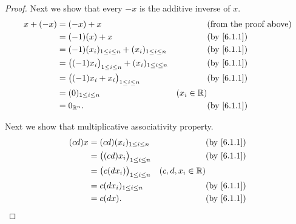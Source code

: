\begin{proof}
  Next we show that every \(-x\) is the additive inverse of \(x\).
  \begin{align*}
    x + (-x) & = (-x) + x                                                      &              & \text{(from the proof above)} \\
             & = (-1)(x) + x                                                   &              & \by{6.1.1}                    \\
             & = (-1)(x_i)_{1 \leq i \leq n} + (x_i)_{1 \leq i \leq n}         &              & \by{6.1.1}                    \\
             & = \big((-1)x_i\big)_{1 \leq i \leq n} + (x_i)_{1 \leq i \leq n} &              & \by{6.1.1}                    \\
             & = \big((-1)x_i + x_i\big)_{1 \leq i \leq n}                     &              & \by{6.1.1}                    \\
             & = (0)_{1 \leq i \leq n}                                         & (x_i \in \R)                                 \\
             & = 0_{\R^n}.                                                     &              & \by{6.1.1}
  \end{align*}

  Next we show that multiplicative associativity property.
  \begin{align*}
    (cd)x & = (cd)(x_i)_{1 \leq i \leq n}          &                    & \by{6.1.1} \\
          & = \big((cd) x_i\big)_{1 \leq i \leq n} &                    & \by{6.1.1} \\
          & = \big(c(d x_i)\big)_{1 \leq i \leq n} & (c, d, x_i \in \R)              \\
          & = c(d x_i)_{1 \leq i \leq n}           &                    & \by{6.1.1} \\
          & = c(dx).                               &                    & \by{6.1.1}
  \end{align*}


\end{proof}
